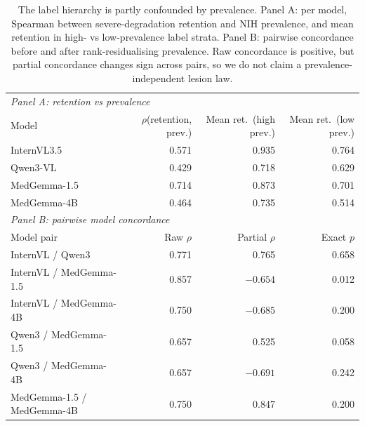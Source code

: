\begin{table}[H]
\centering
\footnotesize
\setlength{\tabcolsep}{3pt}
\caption{The label hierarchy is partly confounded by prevalence. Panel A: per model, Spearman between severe-degradation retention and NIH prevalence, and mean retention in high- vs low-prevalence label strata. Panel B: pairwise concordance before and after rank-residualising prevalence. Raw concordance is positive, but partial concordance changes sign across pairs, so we do not claim a prevalence-independent lesion law.}
\label{tab:hierarchy}
\begin{tabular}{lrrr}
\toprule
\multicolumn{4}{l}{\emph{Panel A: retention vs prevalence}} \\
Model & $\rho$(retention, prev.) & Mean ret.\ (high prev.) & Mean ret.\ (low prev.) \\
\midrule
InternVL3.5 & 0.571 & 0.935 & 0.764 \\
Qwen3-VL & 0.429 & 0.718 & 0.629 \\
MedGemma-1.5 & 0.714 & 0.873 & 0.701 \\
MedGemma-4B & 0.464 & 0.735 & 0.514 \\
\midrule
\multicolumn{4}{l}{\emph{Panel B: pairwise model concordance}} \\
Model pair & Raw $\rho$ & Partial $\rho$ & Exact $p$ \\
\midrule
InternVL / Qwen3 & 0.771 & 0.765 & 0.658 \\
InternVL / MedGemma-1.5 & 0.857 & $-0.654$ & 0.012 \\
InternVL / MedGemma-4B & 0.750 & $-0.685$ & 0.200 \\
Qwen3 / MedGemma-1.5 & 0.657 & 0.525 & 0.058 \\
Qwen3 / MedGemma-4B & 0.657 & $-0.691$ & 0.242 \\
MedGemma-1.5 / MedGemma-4B & 0.750 & 0.847 & 0.200 \\
\bottomrule
\end{tabular}
\end{table}

